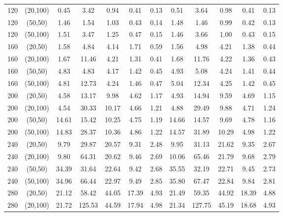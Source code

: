 \documentclass[12pt, eqno, limlimits]{article}
\begin{document}
\begin{sloppypar}
\begin{table}[htpb]
\begin{center}
\begin{tabular}{cccccccccccc}
                    120 & (20,100) & 0.45 &	3.42 & 0.94	& 0.41 & 0.13 &	0.51 & 3.64	& 0.98 & 0.41 &	0.13  \\ 
                    120 & (50,50)  & 1.46 &	1.54 & 1.03	& 0.43 & 0.14 &	1.48 & 1.46	& 0.99 & 0.42 &	0.13  \\ 
                    120 & (50,100) & 1.51 &	3.47 & 1.25 & 0.47 & 0.15 &	1.46 & 3.66	& 1.00 & 0.43 &	0.15   \\ 
                    160 & (20,50)  & 1.58 &	4.84 & 4.14	& 1.71 & 0.59 &	1.56 & 4.98	& 4.21 & 1.38 &	0.44  \\ 
                    160 & (20,100) & 1.67 &	11.46 &	4.21 & 1.31 & 0.41 & 1.68 &	11.76 &	4.22 & 1.36 & 0.43   \\ 
                    160 & (50,50)  & 4.83 &	4.83 & 4.17 & 1.42 & 0.45 &	4.93 & 5.08	& 4.24 & 1.41 &	0.44   \\ 
                    160 & (50,100) & 4.81 & 12.73 &	4.24 & 1.46 & 0.47 & 5.04 & 12.34 &	4.25 & 1.42	& 0.45   \\ 
                    200 & (20,50)  & 4.58 &	13.17 &	9.98 & 4.62 & 1.17 & 4.93 & 14.94 & 9.59 & 4.69 & 1.15   \\ 
                    200 & (20,100) & 4.54 &	30.33 &	10.17 & 4.66 & 1.21 & 4.88 & 29.49 & 9.88 & 4.71 & 1.24    \\ 
                    200 & (50,50)  & 14.61 & 15.42 & 10.25 & 4.75 & 1.19 & 14.66 & 14.57 & 9.69 & 4.78 & 1.16   \\ 
                    200 & (50,100) & 14.83 & 28.37 & 10.36 & 4.86 & 1.22 & 14.57 & 31.89 & 10.29 & 4.98 & 1.22   \\ 
                    240 & (20,50)  & 9.79 &	29.87 & 20.57 & 9.31 & 2.48	& 9.95 & 31.13 & 21.62 & 9.35 & 2.67   \\ 
                    240 & (20,100) & 9.80 &	64.31 & 20.62 &	9.46 & 2.69	& 10.06	& 65.46	& 21.79 & 9.68 & 2.79    \\ 
                    240 & (50,50)  & 34.39 & 31.64 & 22.64 & 9.42 &	2.68 & 35.55 & 32.19 & 22.71 & 9.45	& 2.73    \\ 
                    240 & (50,100) & 34.96 & 66.44 & 22.97 & 9.49 &	2.85 & 35.80 & 67.47 & 22.84 & 9.84 & 2.81    \\ 
                    280 & (20,50)  & 21.12 & 58.42 & 44.05 & 17.39 & 4.93 &	21.49 & 59.35 &	44.92 & 18.39 & 4.88   \\ 
                    280 & (20,100) & 21.72 & 125.53	& 44.59	& 17.94 & 4.98 & 21.34 & 127.75	& 45.19	& 18.68 & 4.93   \\ 

\end{tabular}
\end{center}
\end{table}
\end{sloppypar}
\end{document}
